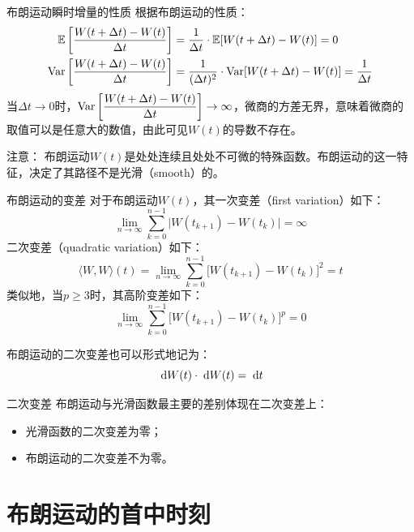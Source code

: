 \documentclass[t]{beamer}
\newcommand{\dif}{{\;\rm d}}
\newcommand{\E}{\mathbb{E}}
\newcommand{\Var}{{\rm Var}}
\begin{document}
\begin{frame}{布朗运动瞬时增量的性质}
  根据布朗运动的性质：
  \[\begin{split}
    \E\left[\frac{W(t+\Delta t)-W(t)}{\Delta t}\right]&=\frac{1}{\Delta t}\cdot \E[W(t+\Delta t)-W(t)]=0\\
    \Var\left[\frac{W(t+\Delta t)-W(t)}{\Delta t}\right]&=\frac{1}{(\Delta t)^2}\cdot \Var[W(t+\Delta t)-W(t)] =\frac{1}{\Delta t}
    \end{split} \]
    当$\Delta t\to 0$时，$\Var\left[\displaystyle\frac{W(t+\Delta t)-W(t)}{\Delta t}\right]\to \infty$，微商的方差无界，意味着微商的取值可以是任意大的数值，由此可见$W(t)$的导数不存在。

    \begin{block}{注意：}
      布朗运动$W(t)$是处处连续且处处不可微的特殊函数。布朗运动的这一特征，决定了其路径不是光滑（smooth）的。
    \end{block}

\end{frame}

\begin{frame}{布朗运动的变差}\small
  对于布朗运动$W(t)$，其一次变差（first variation）如下：
  \[\lim_{n\to\infty} \sum_{k=0}^{n-1}\Big|W(t_{k+1})-W(t_k)\Big|=\infty \]
  二次变差（quadratic variation）如下：
  \[\langle W,W\rangle (t)=\lim_{n\to\infty} \sum_{k=0}^{n-1}\Big[ W(t_{k+1})-W(t_k) \Big]^2=t \]
  类似地，当$p\ge 3$时，其高阶变差如下：
  \[\lim_{n\to\infty} \sum_{k=0}^{n-1}\Big[ W(t_{k+1})-W(t_k) \Big]^p=0 \]

  布朗运动的二次变差也可以形式地记为：
\begin{equation*}
\dif W(t)\cdot \dif W(t)=\dif t
\end{equation*}
\end{frame}


\begin{frame}{二次变差}
  布朗运动与光滑函数最主要的差别体现在二次变差上：
  \begin{itemize}
    \item 光滑函数的二次变差为零；
    \item 布朗运动的二次变差不为零。
  \end{itemize}
\end{frame}



\section{布朗运动的首中时刻}
\end{document}
